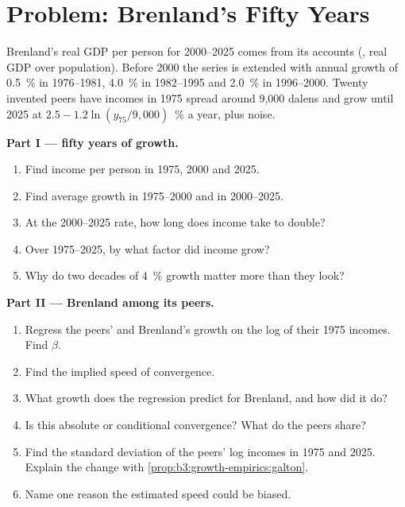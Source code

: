 \section{Problem: Brenland's Fifty Years}\label{sec:b3:growth-empirics:problem}

\begin{problem}\label{pb:b3:growth-empirics:fifty}
Brenland's real GDP per person for 2000--2025 comes from its accounts
(, real GDP over population). Before 2000 the series is extended
with annual growth of 0.5~\% in 1976--1981, 4.0~\% in 1982--1995 and 2.0~\% in 1996--2000. Twenty invented
peers have incomes in 1975 spread around 9{,}000 dalens and grow until 2025 at
$2.5 - 1.2\ln(y_{75}/9{,}000)$~\% a year, plus noise. %

\medskip\noindent\textbf{Part I --- fifty years of growth.}
\begin{enumerate}
\item Find income per person in 1975, 2000 and 2025.
\item Find average growth in 1975--2000 and in 2000--2025.
\item At the 2000--2025 rate, how long does income take to double?
\item Over 1975--2025, by what factor did income grow?
\item Why do two decades of 4~\% growth matter more than they look?
\end{enumerate}

\medskip\noindent\textbf{Part II --- Brenland among its peers.}
\begin{enumerate}[resume]
\item Regress the peers' and Brenland's growth on the log of their 1975 incomes. Find $\beta$.
\item Find the implied speed of convergence.
\item What growth does the regression predict for Brenland, and how did it do?
\item Is this absolute or conditional convergence? What do the peers share?
\item Find the standard deviation of the peers' log incomes in 1975 and 2025. Explain the
change with \cref{prop:b3:growth-empirics:galton}.
\item Name one reason the estimated speed could be biased.
\end{enumerate}


\end{problem}

